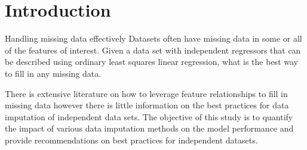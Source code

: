 \documentclass[../paper.tex]{subfiles}
\begin{document}
\section{Introduction}

Handling missing data effectively
Datasets often have missing data in some or all of the features of interest.
Given a data set with independent regressors that can be described using ordinary
least squares linear regression, what is the best way to fill in any missing data.


There is extensive literature on how to leverage feature relationships
to fill in missing data however there is little information on the best practices
for data imputation of independent data sets.
The objective of this study is to quantify the impact of various data
imputation methods on the model performance and provide recommendations on best
practices for independent datasets.
\end{document}
